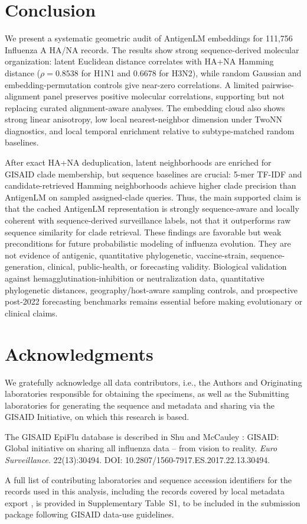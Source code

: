 \documentclass[11pt]{article}
\begin{document}
\section{Conclusion}

We present a systematic geometric audit of AntigenLM embeddings for 111,756 Influenza A HA/NA records. The results show strong sequence-derived molecular organization: latent Euclidean distance correlates with HA+NA Hamming distance ($\rho=0.8538$ for H1N1 and 0.6678 for H3N2), while random Gaussian and embedding-permutation controls give near-zero correlations. A limited pairwise-alignment panel preserves positive molecular correlations, supporting but not replacing curated alignment-aware analyses. The embedding cloud also shows strong linear anisotropy, low local nearest-neighbor dimension under TwoNN diagnostics, and local temporal enrichment relative to subtype-matched random baselines.

After exact HA+NA deduplication, latent neighborhoods are enriched for GISAID clade membership, but sequence baselines are crucial: 5-mer TF-IDF and candidate-retrieved Hamming neighborhoods achieve higher clade precision than AntigenLM on sampled assigned-clade queries. Thus, the main supported claim is that the cached AntigenLM representation is strongly sequence-aware and locally coherent with sequence-derived surveillance labels, not that it outperforms raw sequence similarity for clade retrieval. These findings are favorable but weak preconditions for future probabilistic modeling of influenza evolution. They are not evidence of antigenic, quantitative phylogenetic, vaccine-strain, sequence-generation, clinical, public-health, or forecasting validity. Biological validation against hemagglutination-inhibition or neutralization data, quantitative phylogenetic distances, geography/host-aware sampling controls, and prospective post-2022 forecasting benchmarks remains essential before making evolutionary or clinical claims.

\section*{Acknowledgments}

We gratefully acknowledge all data contributors, i.e., the Authors and Originating laboratories responsible for obtaining the specimens, as well as the Submitting laboratories for generating the sequence and metadata and sharing via the GISAID Initiative, on which this research is based.

The GISAID EpiFlu database is described in Shu and McCauley \cite{shu2017gisaid}: GISAID: Global initiative on sharing all influenza data -- from vision to reality. \emph{Euro Surveillance}. 22(13):30494. DOI: 10.2807/1560-7917.ES.2017.22.13.30494.

A full list of contributing laboratories and sequence accession identifiers for the records used in this analysis, including the records covered by local metadata export , is provided in Supplementary Table~S1, to be included in the submission package following GISAID data-use guidelines.



\end{document}
